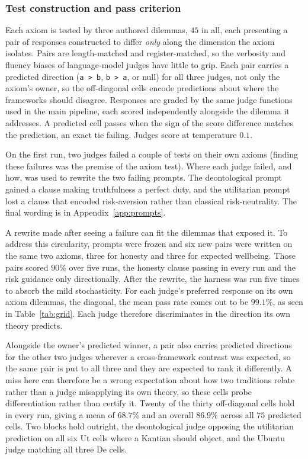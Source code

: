\documentclass[10pt,twocolumn,a4paper]{article}
\begin{document}
\subsubsection{Test construction and pass criterion}
\label{sec:axiom-results}

Each axiom is tested by three authored dilemmas, $45$ in all, each
presenting a pair of responses constructed to differ \emph{only} along
the dimension the axiom isolates. Pairs are length-matched and
register-matched, so the verbosity and fluency biases of language-model
judges have little to grip. Each pair carries a predicted direction
(\texttt{a > b}, \texttt{b > a}, or null) for all three judges, not
only the axiom's owner, so the off-diagonal cells encode predictions
about where the frameworks should disagree. Responses are graded by the
same judge functions used in the main pipeline, each scored
independently alongside the dilemma it addresses. A predicted cell
passes when the sign of the score difference matches the prediction, an
exact tie failing. Judges score at temperature $0.1$. 

On the first run, two judges failed a couple of tests on their own
axioms (finding these failures was the premise of the axiom test).
Where each judge failed, and how, was used to rewrite the two failing
prompts. The deontological prompt gained a clause making
truthfulness a perfect duty, and the utilitarian
prompt lost a clause that encoded risk-aversion rather than classical
risk-neutrality. The final wording is in Appendix~\ref{app:prompts}.


A rewrite made after seeing a failure can fit the dilemmas that exposed
it. To address this circularity, prompts were frozen and six new
pairs were written on the same two axioms, three for honesty and three
for expected wellbeing. Those pairs scored $90\%$ over five runs, the
honesty clause passing in every run and the risk guidance only
directionally. After the rewrite, the harness was run five times to absorb the mild
stochasticity. For each judge's preferred response on its own axiom
dilemmas, the diagonal, the mean pass rate comes out to be $99.1\%$, as
seen in Table~\ref{tab:grid}. Each judge therefore discriminates in the
direction its own theory predicts.

Alongside the owner's predicted winner, a pair also carries predicted directions
for the other two judges wherever a cross-framework contrast was
expected, so the same pair is put to all three and they are expected to
rank it differently. A miss here can therefore be a wrong expectation
about how two traditions relate rather than a judge misapplying its own
theory, so these cells probe differentiation rather than certify it.
Twenty of the thirty off-diagonal cells hold in every run, giving a mean
of $68.7\%$ and an overall $86.9\%$ across all $75$ predicted cells.
Two blocks hold outright, the deontological judge opposing the
utilitarian prediction on all six Ut cells where a Kantian should
object, and the Ubuntu judge matching all three De cells.
\end{document}
